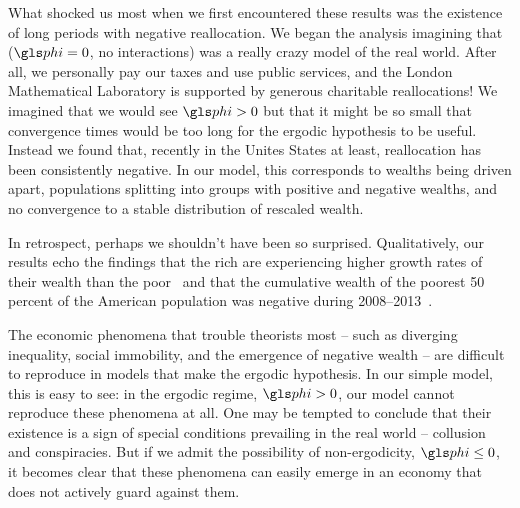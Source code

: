 What shocked us most when we first encountered these results was the existence of long periods with negative reallocation. We began the analysis imagining that \GBM (\ie $\gphi=0$, no interactions) was a really crazy model of the real world. After all, we personally pay our taxes and use public services, and the London Mathematical Laboratory is supported by generous charitable reallocations! We imagined that we would see $\gphi>0$ but that it might be so small that convergence times would be too long for the ergodic hypothesis to be useful. Instead we found that, recently in the Unites States at least, reallocation has been consistently negative. In our model, this corresponds to wealths being driven apart, populations splitting into groups with positive and negative wealths, and no convergence to a stable distribution of rescaled wealth.

In retrospect, perhaps we shouldn't have been so surprised. Qualitatively, our results echo the findings that the rich are experiencing higher growth rates of their wealth than the poor~\cite{Piketty2014,Wolff2014} and that the cumulative wealth of the poorest 50 percent of the American population was negative during 2008--2013~\cite{RiosKuhn2016,WID2017}.

The economic phenomena that trouble theorists most -- such as diverging inequality, social immobility, and the emergence of negative wealth -- are difficult to reproduce in models that make the ergodic hypothesis. In our simple model, this is easy to see: in the ergodic regime, $\gphi>0$, our model cannot reproduce these phenomena at all. One may be tempted to conclude that their existence is a sign of special conditions prevailing in the real world -- collusion and conspiracies. But if we admit the possibility of non-ergodicity, $\gphi\leq0$, it becomes clear that these phenomena can easily emerge in an economy that does not actively guard against them.